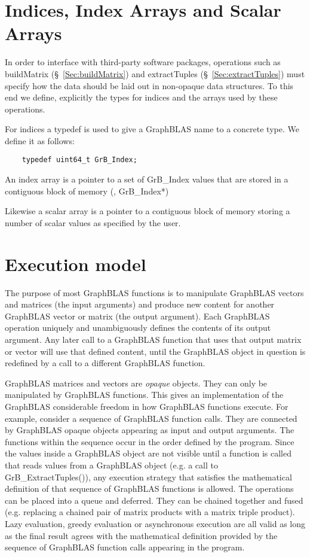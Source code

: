 \section{Indices, Index Arrays and Scalar Arrays}

In order to interface with third-party software packages, operations 
such as buildMatrix (\S~\ref{Sec:buildMatrix})
and extractTuples (\S~\ref{Sec:extractTuples}) must specify how 
the data should be laid out in  non-opaque data structures.  To 
this end we define, explicitly the types for indices and the arrays 
used by these operations.

For indices a typedef is used to give a GraphBLAS name to a concrete type. We define it as follows:

\begin{verbatim}
    typedef uint64_t GrB_Index;
\end{verbatim}

An index array is a pointer to a set of {\sf GrB\_Index} values that are 
stored in a contiguous block of memory (\ie, {\sf GrB\_Index*})

Likewise a scalar array is a pointer to a contiguous block of memory 
storing a number of scalar values as specified by the user.

\section{Execution model}

The purpose of most GraphBLAS functions is to manipulate GraphBLAS 
vectors and matrices (the input arguments) and produce new content for 
another GraphBLAS vector or matrix (the output argument).
Each GraphBLAS operation uniquely and unambiguously defines the 
contents of its output argument.  Any later call to a GraphBLAS function
that uses that output matrix or vector will use that defined content, 
until the GraphBLAS object in question is redefined by a call to 
a different GraphBLAS function.

GraphBLAS matrices and vectors are \emph{opaque} objects. They 
can only be manipulated by GraphBLAS functions. This gives an 
implementation of the GraphBLAS considerable freedom in how 
GraphBLAS functions execute. For example, consider a sequence 
of GraphBLAS function calls.  They are connected by GraphBLAS opaque
objects appearing as input and output arguments.  The functions
within the sequence occur in the order defined by the program.  
Since the values inside a GraphBLAS object are not visible until a 
function is called that reads values from a GraphBLAS object (e.g. 
a call to GrB\_ExtractTuples()),  any execution strategy that 
satisfies the mathematical definition of that sequence of 
GraphBLAS functions is allowed. The operations can be placed into
a queue and deferred.  They can be chained together and fused (e.g.
replacing a chained pair of matrix products with a matrix triple product).
Lazy evaluation, greedy evaluation or asynchronous execution are all
valid as long as the final result agrees with the mathematical 
definition provided by the sequence of GraphBLAS function calls
appearing in the program.

